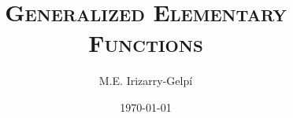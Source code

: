 \documentclass[letterpaper, 12pt]{report}
\begin{document}
\title{\textsc{Generalized Elementary Functions}}
\author{M.E. Irizarry-Gelp\'{i}}
\date{\today}
\maketitle
\tableofcontents








\end{document}
